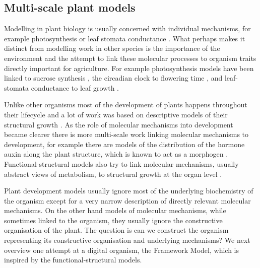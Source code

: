 \subsection{Multi-scale plant models}
Modelling in plant biology is usually concerned with individual mechanisms, for
example photosynthesis \citep{farquhar_biochemical_1980} or leaf stomata
conductance \citep{tardieu1993integration}. What perhaps makes it distinct from
modelling work in other species is the importance of the environment and the
attempt to link these molecular processes to organism traits directly important
for agriculture. For example photosynthesis models have been linked to sucrose
synthesis \citep{zhu_e-photosynthesis:_2013}, the circadian clock to flowering
time \citep{salazar_prediction_2009}, and leaf-stomata conductance to leaf
growth \citep{tardieu2015modelling}.

Unlike other organisms most of the development of plants happens throughout
their lifecycle and a lot of work was based on descriptive models of their
structural growth \citep{mundermann_quantitative_2005}. As the role of molecular
mechanisms into development became clearer there is more multi-scale work
linking molecular mechanisms to development, for example there are models of the
distribution of the hormone auxin along the plant structure, which is known to
act as a morphogen \citep{prusinkiewicz2009control,
  jonsson2006auxin}. Functional-structural models also try to link molecular
mechanisms, usually abstract views of metabolism, to structural growth at the
organ level \citep{christophe_model-based_2008}.

Plant development models usually ignore most of the underlying biochemistry of
the organism except for a very narrow description of directly relevant molecular
mechanisms. On the other hand models of molecular mechanisms, while sometimes
linked to the organism, they usually ignore the constructive organisation of the
plant. The question is can we construct the organism representing its
constructive organisation and underlying mechanisms? We next overview one
attempt at a digital organism, the Framework Model, which is inspired by the
functional-structural models.

